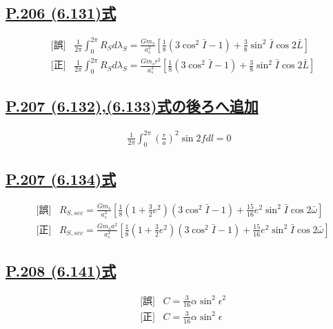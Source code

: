 \documentclass[9pt,fleqn]{bxjsarticle}
\begin{document}
\subsection*{\underline{P.206 (6.131)式}}
\begin{align*}
    &\text{[誤]} \hspace{10pt} \frac{1}{2\pi}\int_{0}^{2\pi}R_Sd\lambda_S = \frac{Gm_s}{a_s^3}\left[\frac{1}{8}\left(3\cos^2\bar{I}-1\right)+\frac{3}{8}\sin^2\bar{I}\cos{2\bar{L}}\right] \\
    &\text{[正]} \hspace{10pt} \frac{1}{2\pi}\int_{0}^{2\pi}R_Sd\lambda_S = \frac{Gm_sr^2}{a_s^3}\left[\frac{1}{8}\left(3\cos^2\bar{I}-1\right)+\frac{3}{8}\sin^2\bar{I}\cos{2\bar{L}}\right]
\end{align*}

\subsection*{\underline{P.207 (6.132),(6.133)式の後ろへ追加}}
\begin{align*}
    \frac{1}{2\pi}\int_{0}^{2\pi}\left(\frac{r}{a}\right)^2\sin{2f}dl = 0 
\end{align*}

\subsection*{\underline{P.207 (6.134)式}}
\begin{align*}
    &\text{[誤]} \hspace{10pt} R_{S,sec} = \frac{Gm_s}{a_s^3}\left[\frac{1}{8}\left(1+\frac{3}{2}e^2\right)\left(3\cos^2\bar{I}-1\right) + \frac{15}{16}e^2\sin^2\bar{I}\cos{2\bar{\omega}}\right] \\
    &\text{[正]} \hspace{10pt} R_{S,sec} = \frac{Gm_sa^2}{a_s^3}\left[\frac{1}{8}\left(1+\frac{3}{2}e^2\right)\left(3\cos^2\bar{I}-1\right) + \frac{15}{16}e^2\sin^2\bar{I}\cos{2\bar{\omega}}\right]
\end{align*}

\subsection*{\underline{P.208 (6.141)式}}
\begin{align*}
    &\text{[誤]} \hspace{10pt} C = \frac{3}{16}\alpha\sin^2{\epsilon^2} \\
    &\text{[正]} \hspace{10pt} C = \frac{3}{16}\alpha\sin^2{\epsilon} 
\end{align*}
\end{document}
